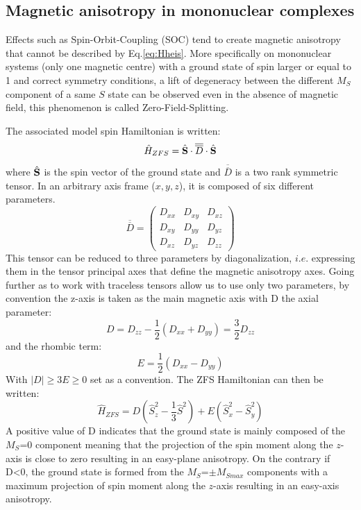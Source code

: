 \documentclass[12pt,a4paper]{report}
\numberwithin{equation}{section}
\begin{document}
\subsection{Magnetic anisotropy in mononuclear complexes}

\par Effects such as Spin-Orbit-Coupling (SOC) tend to create magnetic anisotropy that cannot be described by Eq.\ref{eq:Hheis}. 
More specifically on mononuclear systems (only one magnetic centre) with a ground state of spin larger or equal to 1 and correct symmetry conditions, a lift of degeneracy between the different $M_S$ component of a same $S$ state can be observed even in the absence of magnetic field, this phenomenon is called Zero-Field-Splitting.

The associated model spin Hamiltonian is written:\cite{noauthor_molecular_1995}
\begin{equation}\label{SDS}
    \hat{H}_{ZFS}=\hat{\vb S} \cdot \overline{\overline{D}} \cdot \hat{\vb S}
\end{equation}
where $\hat{\vb S}$ is the spin vector of the ground state and $\overline{\overline{D}}$ is a two rank symmetric tensor. In an arbitrary axis frame ($x,y,z$), it is composed of six different parameters.
\begin{equation}
    \overline{\overline{D}}=\begin{pmatrix}
        D_{xx} & D_{xy} & D_{xz}\\
        D_{xy} & D_{yy} & D_{yz}\\
        D_{xz} & D_{yz} & D_{zz}
    \end{pmatrix}
\end{equation}
This tensor can be reduced to three parameters by diagonalization, $\textit{i.e.}$ expressing them in the tensor principal axes that define the magnetic anisotropy axes.
Going further as to work with traceless tensors allow us to use only two parameters, by convention the z-axis is taken as the main magnetic axis with D the axial parameter:
\begin{equation}\label{ParametreD}
    D=D_{zz}-\frac{1}{2}(D_{xx}+D_{yy})=\frac{3}{2}D_{zz}
\end{equation}
and the rhombic term:
\begin{equation}\label{ParametreE}
    E=\frac{1}{2}(D_{xx}-D_{yy})
\end{equation}
With $|D| \geq 3E \geq 0$ set as a convention.\cite{maurice_universal_2009}
The ZFS Hamiltonian can then be written:
\begin{equation}\label{HZFS}
    \hat{H}_{ZFS}=D (\hat{S}_z^2-\frac{1}{3}\hat{S}^2)+E(\hat{S}_x^2-\hat{S}_y^2)
\end{equation}
A positive value of D indicates that the ground state is mainly composed of the $M_S$=0 component meaning that the projection of the spin moment along the $z$-axis is close to zero resulting in an easy-plane anisotropy. 
On the contrary if D<0, the ground state is formed from the $M_S$=$\pm M_{Smax}$ components with a maximum projection of spin moment along the $z$-axis resulting in an easy-axis anisotropy.
\end{document}

